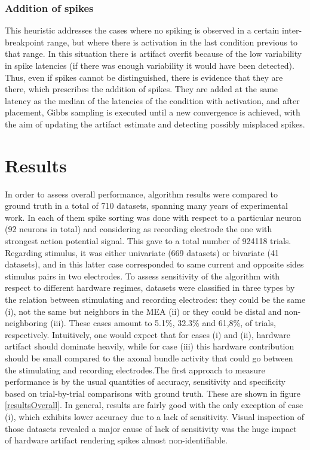 \documentclass[12pt,letterpaper,fleqn]{article}
\begin{document}
\subsubsection{Addition of spikes}
This heuristic addresses the cases where no spiking is observed in a certain inter-breakpoint range, but where there is activation in the last condition previous to that range. In this situation there is artifact overfit because of the low variability in spike latencies (if there was enough variability it would have been detected). Thus, even if spikes cannot be distinguished, there is evidence that they are there, which prescribes the addition of spikes. They are added at the same latency as the median of the latencies of the condition with activation, and after placement, Gibbs sampling is executed until a new convergence is achieved, with the aim of updating the artifact estimate and detecting possibly misplaced spikes.
\pagebreak

\section{Results}
In order to assess overall performance, algorithm results were compared to ground truth in a total of 710 datasets, spanning many years of experimental work. In each of them spike sorting was done with respect to a particular neuron (92 neurons in total) and considering as recording electrode the one with strongest action potential signal. This gave to a total number of 924118 trials. Regarding stimulus, it was either univariate (669 datasets) or bivariate (41 datasets), and in this latter case corresponded to same current and opposite sides stimulus pairs in two electrodes. To assess sensitivity of the algorithm with respect to different hardware regimes, datasets were classified in three types by the relation between stimulating and recording electrodes: they could be the same (i), not the same but neighbors in the MEA (ii) or they could be distal and non-neighboring (iii). These cases amount to 5.1\%, 32.3\% and 61,8\%, of trials, respectively. Intuitively, one would expect that for cases (i) and (ii), hardware artifact should dominate heavily, while for case (iii) this hardware contribution should be small compared to the axonal bundle activity that could go between the stimulating and recording electrodes.The first approach to measure performance is by the usual quantities of accuracy, sensitivity and specificity based on trial-by-trial comparisons with ground truth. These are shown in figure \ref{resultsOverall}.  In general, results are fairly good with the only exception of case (i), which exhibits lower accuracy due to a lack of sensitivity. Visual inspection of those datasets revealed a major cause of lack of sensitivity was the huge impact of hardware artifact rendering spikes almost non-identifiable.\\
\end{document}
